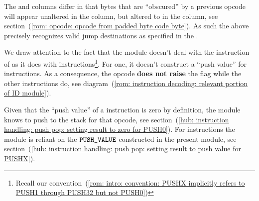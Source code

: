 \saNote{}
The \opc{} and \pbcb{} columns differ in that bytes that are ``obscured'' by a previous  opcode
will appear unaltered in the \pbcb{} column, but altered to  in the \opc{} column, see section~(\ref{rom: opcode: opcode from padded byte code byte}).
As such the above precisely recognizes valid jump destinations as specified in the \cite{EYP-London}.

\saNote{}
\label{rom: columns: IS_PUSH_FLAG does not light up for PUSH0}
We draw attention to the fact that the \romMod{} module
doesn't deal with the  instruction of \cite{EIP-3855} as it does with
 instructions\footnote{Recall our convention~(\ref{rom: intro: convention: PUSHX implicitly refers to PUSH1 through PUSH32 but not PUSH0})}.
For one, it doesn't construct a ``push value'' for  instructions.
As a consequence, the  opcode \textbf{does not raise} the \IP{} flag while the other  instructions do,
see diagram~(\ref{rom: instruction decoding: relevant portion of ID module}).

\saNote{}
\label{rom: columns: push values for PUSH0 vs PUSHX in the HUB}
Given that the ``push value'' of a  instruction is zero by definition,
the \hubMod{} module knows to push  to the stack for that opcode,
see section~(\ref{hub: instruction handling: push pop: setting result to zero for PUSH0}).
For  instructions the \hubMod{} module is reliant on the $\texttt{PUSH\_VALUE}$ constructed in the present module,
see section~(\ref{hub: instruction handling: push pop: setting result to push value for PUSHX}).
